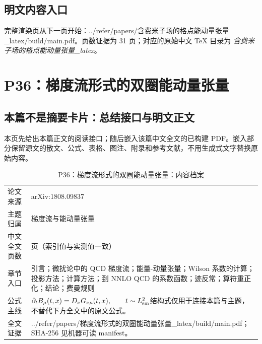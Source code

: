 \documentclass[UTF8,11pt,oneside]{ctexbook}
\begin{document}
\section*{明文内容入口}
\noindent 完整渲染页从下一页开始：../\allowbreak{}refer/\allowbreak{}papers/\allowbreak{}含费米子场的格点能动量张量\_\allowbreak{}latex/\allowbreak{}build/\allowbreak{}main.pdf。页数证据为 31 页；对应的原始中文 TeX 目录为 \emph{含费米子场的格点能动量张量\_latex}。
\clearpage

\clearpage

\chapter{P36：梯度流形式的双圈能动量张量}
\section*{本篇不是摘要卡片：总结接口与明文正文}
本页先给出本篇正文的阅读接口；随后嵌入该篇中文全文的已构建 PDF。嵌入部分保留源文的散文、公式、表格、图注、附录和参考文献，不用生成式文字替换原始内容。
\begin{table}[htbp]
  \centering
  \caption{P36：梯度流形式的双圈能动量张量：内容档案}
  \small
  \begin{tabularx}{0.96\textwidth}{@{}p{3.3cm}>{\raggedright\arraybackslash}X@{}}
    \toprule
    论文来源 & arXiv:1808.09837 \\
    主题归属 & 梯度流与能动量张量 \\
    中文全文页数 & 19 页（索引值与实测值一致） \\
    章节入口 & 引言；微扰论中的 QCD 梯度流；能量-动量张量；Wilson 系数的计算；投影方法；计算方法；到 NNLO QCD 的系数函数；迹反常；算符重正化；结论；费曼规则 \\
    公式主线 & $\partial_t B_\mu(t,x)=D_\nu G_{\nu\mu}(t,x),\qquad t\sim L_{\rm sm}^{2}$\newline\scriptsize 结构式仅用于连接本篇与主题，不替代下方全文中的原文公式。 \\
    全文证据 & ../\allowbreak{}refer/\allowbreak{}papers/\allowbreak{}梯度流形式的双圈能动量张量\_\allowbreak{}latex/\allowbreak{}build/\allowbreak{}main.pdf；SHA-256 见机器可读 manifest。 \\
    \bottomrule
  \end{tabularx}
\end{table}
\end{document}
